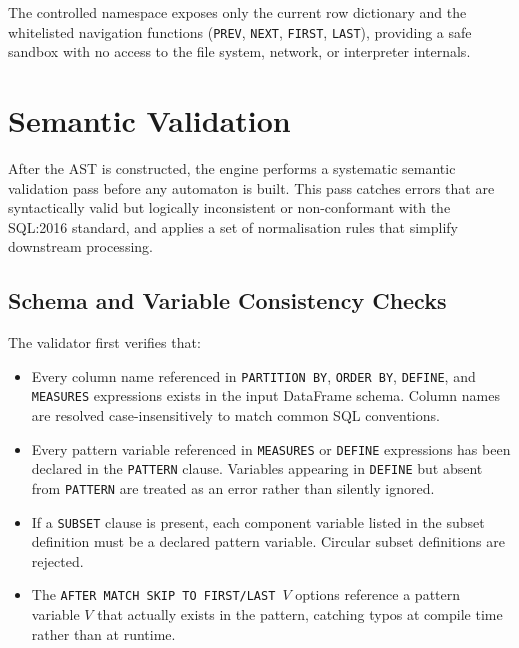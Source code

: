 The controlled namespace exposes only the current row dictionary and
the whitelisted navigation functions (\texttt{PREV}, \texttt{NEXT},
\texttt{FIRST}, \texttt{LAST}), providing a safe sandbox with no
access to the file system, network, or interpreter internals.


\section{Semantic Validation}
\label{sec:meth-semantic}

After the AST is constructed, the engine performs a systematic
semantic validation pass before any automaton is built.  This pass
catches errors that are syntactically valid but logically
inconsistent or non-conformant with the SQL:2016 standard, and
applies a set of normalisation rules that simplify downstream
processing.

\subsection{Schema and Variable Consistency Checks}
\label{subsec:sem-schema}

The validator first verifies that:

\begin{itemize}
  \item Every column name referenced in \texttt{PARTITION BY},
    \texttt{ORDER BY}, \texttt{DEFINE}, and \texttt{MEASURES}
    expressions exists in the input DataFrame schema.
    Column names are resolved case-insensitively to match
    common SQL conventions.

  \item Every pattern variable referenced in \texttt{MEASURES} or
    \texttt{DEFINE} expressions has been declared in the
    \texttt{PATTERN} clause.  Variables appearing in
    \texttt{DEFINE} but absent from \texttt{PATTERN} are treated
    as an error rather than silently ignored.

  \item If a \texttt{SUBSET} clause is present, each component
    variable listed in the subset definition must be a declared
    pattern variable.  Circular subset definitions are rejected.

  \item The \texttt{AFTER MATCH SKIP TO FIRST/LAST $V$} options
    reference a pattern variable $V$ that actually exists in the
    pattern, catching typos at compile time rather than at runtime.
\end{itemize}

